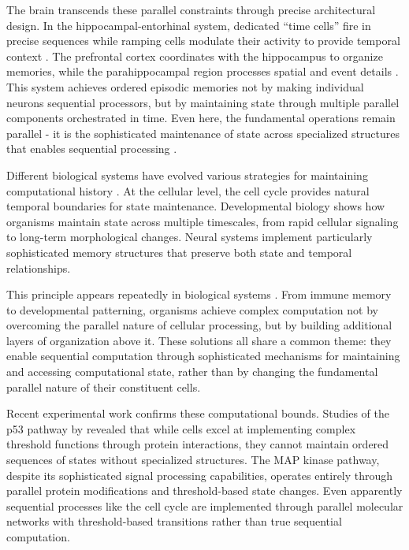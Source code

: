 \documentclass[12pt]{article}
\begin{document}
The brain transcends these parallel constraints through precise architectural design. In the hippocampal-entorhinal system, dedicated ``time cells'' fire in precise sequences while ramping cells modulate their activity to provide temporal context \cite{quentin2019differential}. The prefrontal cortex coordinates with the hippocampus to organize memories, while the parahippocampal region processes spatial and event details \cite{martini2015information}. This system achieves ordered episodic memories not by making individual neurons sequential processors, but by maintaining state through multiple parallel components orchestrated in time. Even here, the fundamental operations remain parallel - it is the sophisticated maintenance of state across specialized structures that enables sequential processing \cite{bruno2022epigenetic}.

Different biological systems have evolved various strategies for maintaining computational history \cite{espinosa2024molecular}. At the cellular level, the cell cycle provides natural temporal boundaries for state maintenance. Developmental biology shows how organisms maintain state across multiple timescales, from rapid cellular signaling to long-term morphological changes. Neural systems implement particularly sophisticated memory structures that preserve both state and temporal relationships.

This principle appears repeatedly in biological systems \cite{fu2024memory}. From immune memory to developmental patterning, organisms achieve complex computation not by overcoming the parallel nature of cellular processing, but by building additional layers of organization above it. These solutions all share a common theme: they enable sequential computation through sophisticated mechanisms for maintaining and accessing computational state, rather than by changing the fundamental parallel nature of their constituent cells.

Recent experimental work confirms these computational bounds. Studies of the p53 pathway by \cite{batchelor2023dynamic} revealed that while cells excel at implementing complex threshold functions through protein interactions, they cannot maintain ordered sequences of states without specialized structures. The MAP kinase pathway, despite its sophisticated signal processing capabilities, operates entirely through parallel protein modifications and threshold-based state changes. Even apparently sequential processes like the cell cycle are implemented through parallel molecular networks with threshold-based transitions rather than true sequential computation.
\end{document}

